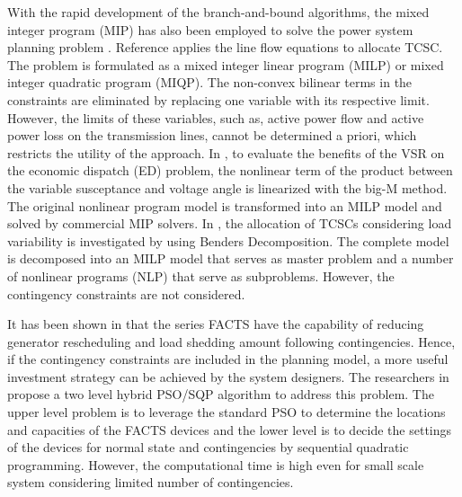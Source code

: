 \documentclass[journal]{IEEEtran}
\begin{document}
With the rapid development of the branch-and-bound algorithms, the mixed integer program (MIP) has also been employed to solve the power system planning problem \cite{mybibb:tep_es_conje,mybibb:bilevel_wind_tep_csee}.  Reference \cite{mybibb:TCSCLFB} applies the line flow equations \cite{mybibb:LFB} to allocate TCSC. The problem is formulated as a mixed integer linear program (MILP) or mixed integer quadratic program (MIQP). The non-convex bilinear terms in the constraints are eliminated by replacing one variable with its respective limit. However, the limits of these variables, such as, active power flow and active power loss on the transmission lines, cannot be determined a priori, which restricts the utility of the approach. In \cite{mybibb:asu_FACTS1,mybibb:Tao_Ding}, to evaluate the benefits of the VSR on the economic dispatch (ED) problem, the nonlinear term of the product between the variable susceptance and voltage angle is linearized with the big-M method. The original nonlinear program model is transformed into an MILP model and solved by commercial MIP solvers. In \cite{mybibb:tcsc_ac}, the allocation of TCSCs considering load variability is investigated by using Benders Decomposition. The complete model is decomposed into an MILP model that serves as master problem and a number of nonlinear programs (NLP) that serve as subproblems. However, the contingency constraints are not considered.

It has been shown in \cite{mybibb:opf_redispatch_facts} that the series FACTS have the capability of reducing generator rescheduling and load shedding amount following contingencies. Hence, if the contingency constraints are included in the planning model, a more useful investment strategy can be achieved by the system designers. The researchers in \cite{mybibb:PSO_SQP_FACTS} propose a two level hybrid PSO/SQP algorithm to address this problem. The upper level problem is to leverage the standard PSO to determine the locations and capacities of the FACTS devices and the lower level is to decide the settings of the devices for normal state and contingencies by sequential quadratic programming. However, the computational time is high even for small scale system considering limited number of contingencies.   
\end{document}
